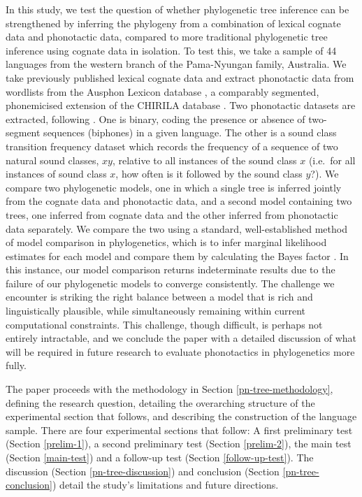 In this study, we test the question of whether phylogenetic tree inference can be strengthened by inferring the phylogeny from a combination of lexical cognate data and phonotactic data, compared to more traditional phylogenetic tree inference using cognate data in isolation. To test this, we take a sample of 44 languages from the western branch of the Pama-Nyungan family, Australia. We take previously published lexical cognate data \autocite{bouckaert_origin_2018} and extract phonotactic data from wordlists from the Ausphon Lexicon database \autocite{round_ausphon-lexicon_2017}, a comparably segmented, phonemicised extension of the CHIRILA database \autocite{bowern_chirila_2016}. Two phonotactic datasets are extracted, following \textcite{macklin-cordes_phylogenetic_2020}. One is binary, coding the presence or absence of two-segment sequences (biphones) in a given language. The other is a sound class transition frequency dataset which records the frequency of a sequence of two natural sound classes, \(xy\), relative to all instances of the sound class \(x\) (i.e.~for all instances of sound class \(x\), how often is it followed by the sound class \(y\)?). We compare two phylogenetic models, one in which a single tree is inferred jointly from the cognate data and phonotactic data, and a second model containing two trees, one inferred from cognate data and the other inferred from phonotactic data separately. We compare the two using a standard, well-established method of model comparison in phylogenetics, which is to infer marginal likelihood estimates for each model and compare them by calculating the Bayes factor \autocites{kass_bayes_1995}{brown_importance_2007}. In this instance, our model comparison returns indeterminate results due to the failure of our phylogenetic models to converge consistently. The challenge we encounter is striking the right balance between a model that is rich and linguistically plausible, while simultaneously remaining within current computational constraints. This challenge, though difficult, is perhaps not entirely intractable, and we conclude the paper with a detailed discussion of what will be required in future research to evaluate phonotactics in phylogenetics more fully.

The paper proceeds with the methodology in Section \ref{pn-tree-methodology}, defining the research question, detailing the overarching structure of the experimental section that follows, and describing the construction of the language sample. There are four experimental sections that follow: A first preliminary test (Section \ref{prelim-1}), a second preliminary test (Section \ref{prelim-2}), the main test (Section \ref{main-test}) and a follow-up test (Section \ref{follow-up-test}). The discussion (Section \ref{pn-tree-discussion}) and conclusion (Section \ref{pn-tree-conclusion}) detail the study's limitations and future directions.

